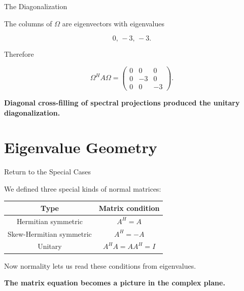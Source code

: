 \documentclass[10pt]{beamer}
\theoremstyle{definition}
\newcommand{\x}[1]{\alert{\textbf{#1}}}
\begin{document}
\begin{frame}{The Diagonalization}

The columns of $\Omega$ are eigenvectors with eigenvalues

$$
0,\,-3,\,-3.
$$

\vfill\pause

Therefore

$$
\boxed{
\Omega^HA\Omega
=
\begin{pmatrix}
0&0&0\\
0&-3&0\\
0&0&-3
\end{pmatrix}.
}
$$

\vfill

\x{Diagonal cross-filling of spectral projections produced the unitary diagonalization.}

\end{frame}


\section{Eigenvalue Geometry}

\begin{frame}{Return to the Special Cases}

We defined three special kinds of normal matrices:

\vfill

\begin{center}
\renewcommand{\arraystretch}{1.5}
\scriptsize
\begin{tabular}{c|c}
\textbf{Type} & \textbf{Matrix condition} \\
\hline
Hermitian symmetric & $A^H=A$ \\
Skew-Hermitian symmetric & $A^H=-A$ \\
Unitary & $A^HA=AA^H=I$
\end{tabular}
\end{center}

\vfill\pause

Now normality lets us read these conditions from eigenvalues.

\vfill

\x{The matrix equation becomes a picture in the complex plane.}

\end{frame}
\end{document}

